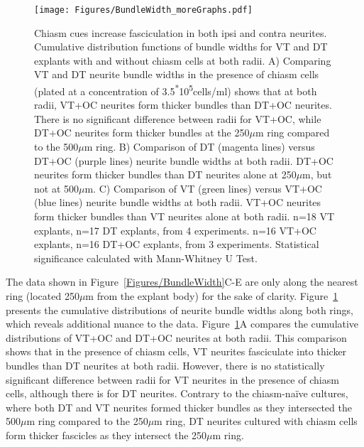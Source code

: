 \begin{figure}[hbtp]
    \begin{center}
        \texttt{[image: Figures/BundleWidth\_moreGraphs.pdf]}
        \caption[Chiasm cues increase fasciculation in both ipsi and contra neurites.]
        {Chiasm cues increase fasciculation in both ipsi and contra neurites.
        Cumulative distribution functions of bundle widths for VT and DT explants with and without chiasm cells at both radii.
        A) Comparing VT and DT neurite bundle widths in the presence of chiasm cells (plated at a concentration of 3.5\textsuperscript{*}10\textsuperscript{5}cells/ml) shows that at both radii, VT+OC neurites form thicker bundles than DT+OC neurites.
        There is no significant difference between radii for VT+OC, while DT+OC neurites form thicker bundles at the 250$\mu$m ring compared to the 500$\mu$m ring.
        B) Comparison of DT (magenta lines) versus DT+OC (purple lines) neurite bundle widths at both radii.
        DT+OC neurites form thicker bundles than DT neurites alone at 250$\mu$m, but not at 500$\mu$m.
        C) Comparison of VT (green lines) versus VT+OC (blue lines) neurite bundle widths at both radii.
        VT+OC neurites form thicker bundles than VT neurites alone at both radii.
        n=18 VT explants, n=17 DT explants, from 4 experiments.
        n=16 VT+OC explants, n=16 DT+OC explants, from 3 experiments.
        Statistical significance calculated with Mann-Whitney U Test.
        }
        \label{Figures/BundleWidthmoreGraphs}
    \end{center}
\end{figure}
The data shown in Figure~\ref{Figures/BundleWidth}C-E are only along the nearest ring (located 250$\mu$m from the explant body) for the sake of clarity.
Figure~\ref{Figures/BundleWidthmoreGraphs} presents the cumulative distributions of neurite bundle widths along both rings, which reveals additional nuance to the data.
Figure~\ref{Figures/BundleWidthmoreGraphs}A compares the cumulative distributions of VT+OC and DT+OC neurites at both radii.
This comparison shows that in the presence of chiasm cells, VT neurites fasciculate into thicker bundles than DT neurites at both radii.
However, there is no statistically significant difference between radii for VT neurites in the presence of chiasm cells, although there is for DT neurites.
Contrary to the chiasm-na\"ive cultures, where both DT and VT neurites formed thicker bundles as they intersected the 500$\mu$m ring compared to the 250$\mu$m ring, DT neurites cultured with chiasm cells form thicker fascicles as they intersect the 250$\mu$m ring.
